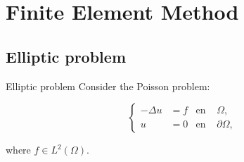 \section{Finite Element Method}

\subsection{Elliptic problem}

\begin{frame}{Elliptic problem}
Consider the Poisson problem:
\begin{block}{}
\begin{equation*}
\left\{
\begin{aligned}
-\Delta u&=f & \text{en } &\Omega, \\
u&=0 & \text{en } &\partial\Omega,
\end{aligned}
\right.
\end{equation*}
\end{block}
where $f\in L^2\left(\Omega\right)$.
\end{frame}


